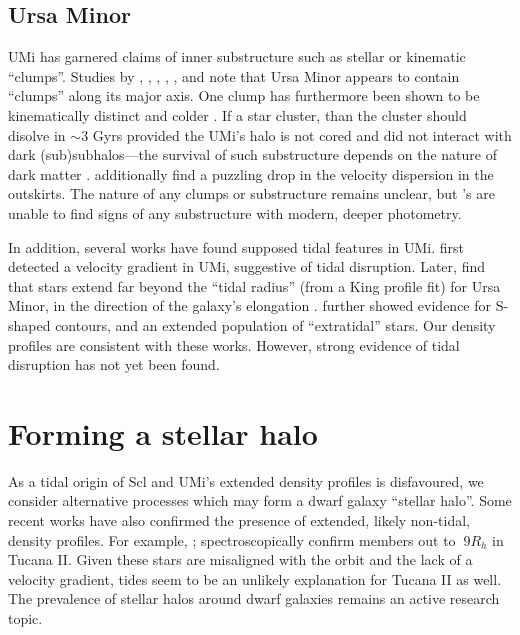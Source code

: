 \subsection{Ursa Minor}\label{ursa-minor}

UMi has garnered claims of inner substructure such as stellar or
kinematic ``clumps''. Studies by \citet{olszewski+aaronson1985},
\citet{demers+1995}, \citet{IH1995}, \citet{kleyna+1998},
\citet{battinelli+demers1999}, and \citet{bellazzini+2002} note that
Ursa Minor appears to contain ``clumps'' along its major axis. One clump
has furthermore been shown to be kinematically distinct and colder
\citep[e.g.,][]{pace+2014}. If a star cluster, than the cluster should
disolve in \(\sim 3\) Gyrs provided the UMi's halo is not cored and did
not interact with dark (sub)subhalos---the survival of such substructure
depends on the nature of dark matter \citep{kleyna+2003, lora+2012}.
\citet{wilkinson+2004} additionally find a puzzling drop in the velocity
dispersion in the outskirts. The nature of any clumps or substructure
remains unclear, but \citet{munoz+2018}'s are unable to find signs of
any substructure with modern, deeper photometry.

In addition, several works have found supposed tidal features in UMi.
\citet{hargreaves+1994} first detected a velocity gradient in UMi,
suggestive of tidal disruption. Later, \citet{martinez-delgado+2001}
find that stars extend far beyond the ``tidal radius'' (from a King
profile fit) for Ursa Minor, in the direction of the galaxy's elongation
\citep[see corresponding simulations
by][]{gomez-flechoso+martinez-delgado2003}. \citet{palma+2003} further
showed evidence for S-shaped contours, and an extended population of
``extratidal'' stars. Our density profiles are consistent with these
works. However, strong evidence of tidal disruption has not yet been
found.

\section{Forming a stellar halo}\label{sec:stellar_halos}

As a tidal origin of Scl and UMi's extended density profiles is
disfavoured, we consider alternative processes which may form a dwarf
galaxy ``stellar halo''. Some recent works have also confirmed the
presence of extended, likely non-tidal, density profiles. For example,
\citet{chiti+2021}; \citet{chiti+2023} spectroscopically confirm members
out to \(~9 R_h\) in Tucana II. Given these stars are misaligned with
the orbit and the lack of a velocity gradient, tides seem to be an
unlikely explanation for Tucana II as well. The prevalence of stellar
halos around dwarf galaxies remains an active research topic.

